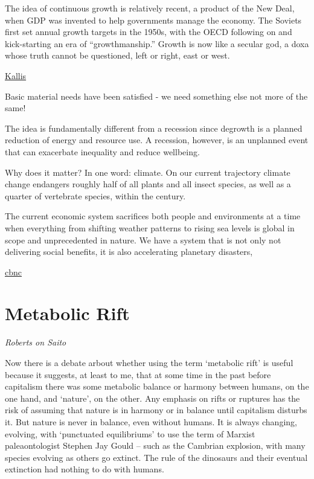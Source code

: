 \documentclass[
]{book}
\begin{document}
The idea of continuous growth is relatively recent, a product of the New Deal, when GDP was invented to help governments manage the economy. The Soviets first set annual growth targets in the 1950s, with the OECD following on and kick-starting an era of ``growthmanship.'' Growth is now like a secular god, a doxa whose truth cannot be questioned, left or right, east or west.

\href{https://www.cato-unbound.org/2021/04/14/giorgos-kallis/why-malthuss-gospel-growth-was-still-wrong}{Kallis}

Basic material needs have been satisfied - we need something else not more of the same!

The idea is fundamentally different from a recession since
degrowth is a planned reduction of energy and resource use.
A recession, however, is an unplanned event that can exacerbate inequality and reduce wellbeing.

Why does it matter?
In one word: climate.
On our current trajectory climate change endangers roughly half of all plants and all insect species,
as well as a quarter of vertebrate species, within the century.

The current economic system sacrifices both people and environments at a time when everything from shifting weather patterns to rising sea levels is global in scope and unprecedented in nature.
We have a system that is not only not delivering social benefits, it is also accelerating planetary disasters,

\href{https://www.cnbc.com/amp/2021/02/19/degrowth-pushing-social-wellbeing-and-climate-over-economic-growth.html}{cbnc}

\hypertarget{metabolic-rift}{%
\section{Metabolic Rift}\label{metabolic-rift}}

\emph{Roberts on Saito}

Now there is a debate arbout whether using the term `metabolic rift' is useful because it suggests, at least to me, that at some time in the past before capitalism there was some metabolic balance or harmony between humans, on the one hand, and `nature', on the other. Any emphasis on rifts or ruptures has the risk of assuming that nature is in harmony or in balance until capitalism disturbs it. But nature is never in balance, even without humans. It is always changing, evolving, with `punctuated equilibriums' to use the term of Marxist paleaontologist Stephen Jay Gould -- such as the Cambrian explosion, with many species evolving as others go extinct. The rule of the dinosaurs and their eventual extinction had nothing to do with humans.
\end{document}
